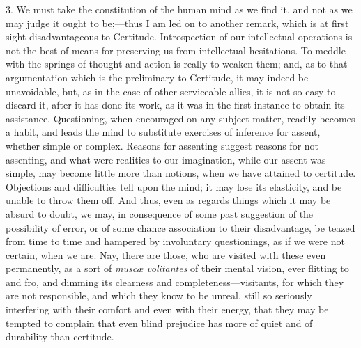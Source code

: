 3. We must take the constitution of the human mind as we find it,
and not as we may judge it ought to be;—thus I am led on to another
remark, which is at first sight disadvantageous to Certitude.
Introspection of our intellectual operations is not the best of means
for preserving us from intellectual hesitations. To meddle with
the springs of thought and action is really to weaken them; and, as to
that argumentation which is the preliminary to Certitude, it may
indeed be unavoidable, but, as in the case of other serviceable
allies, it is not so easy to discard it, after it has done its work,
as it was in the first instance to obtain its assistance. Questioning,
when encouraged on any subject-matter, readily becomes a habit, and
leads the mind to substitute exercises of inference for assent,
whether simple or complex. Reasons for assenting suggest reasons for
not assenting, and what were realities to our imagination, while our
assent was simple, may become little more than notions, when we have
attained to certitude. Objections and difficulties tell upon the mind;
it may lose its elasticity, and be unable to throw them off. And thus,
even as regards things which it may be absurd to doubt, we may, in
consequence of some past suggestion of the possibility of error, or of
some chance association to their disadvantage, be teazed from time to
time and hampered by involuntary questionings, as if we were not
certain, when we are. Nay, there are those, who are visited with these
even permanently, as a sort of \emph{muscæ volitantes} of their
mental vision, ever flitting to and fro, and dimming its clearness and
completeness—visitants, for which they are not responsible, and
which they know to be unreal, still so seriously interfering with
their comfort and even with their energy, that they may be tempted to
complain that even blind prejudice has more of quiet and of durability
than certitude.

